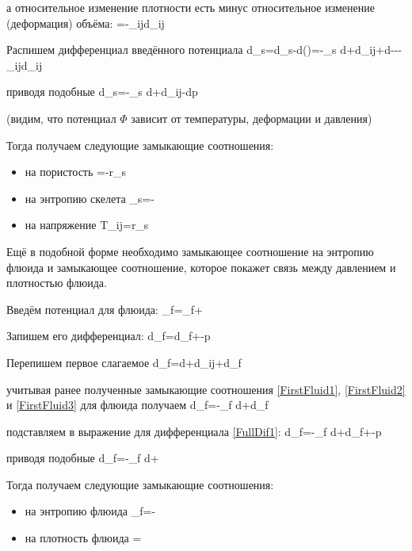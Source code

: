 \documentclass[main.tex]{subfiles}
\begin{document}
а относительное изменение плотности есть минус относительное изменение (деформация) объёма:
\beq
{}=-\delta_{ij}d\varepsilon_{ij}
\eeq

Распишем дифференциал введённого потенциала
\beq
d\Phi_s=d\tilde{\Psi}_s-d\left(\right)=-\eta_s d\theta+d\varepsilon_{ij}+d\varphi---\delta_{ij}d\varepsilon_{ij}
\eeq

приводя подобные
\beq
d\Phi_s=-\eta_s d\theta+d\varepsilon_{ij}-dp
\eeq

(видим, что потенциал $\Phi$ зависит от температуры, деформации и давления)

Тогда получаем следующие замыкающие соотношения:

\begin{itemize}
\item на пористость
\beq
\varphi=-r_s
\eeq

\item на энтропию скелета
\beq
\eta_s=-
\eeq

\item на напряжение
\beq
T_{ij}=r_s
\eeq
\end{itemize}

Ещё в подобной форме необходимо замыкающее соотношение на энтропию флюида и замыкающее соотношение, которое покажет связь между давлением и плотностью флюида.

Введём потенциал для флюида:
\beq
\Phi_f=\Psi_f+
\eeq

Запишем его дифференциал:
\beq\label{FullDif1}
d\Phi_f=d\Psi_f+-p
\eeq

Перепишем первое слагаемое
\beq
d\Psi_f=d\theta+d\varepsilon_{ij}+d\rho_f
\eeq

учитывая ранее полученные замыкающие соотношения \eqref{FirstFluid1}, \eqref{FirstFluid2} и \eqref{FirstFluid3} для флюида получаем
\beq
d\Psi_f=-\eta_f d\theta+d\rho_f
\eeq

подставляем в выражение для дифференциала \eqref{FullDif1}:
\beq
d\Phi_f=-\eta_f d\theta+d\rho_f+-p
\eeq

приводя подобные
\beq
d\Phi_f=-\eta_f d\theta+
\eeq

Тогда получаем следующие замыкающие соотношения:

\begin{itemize}
\item на энтропию флюида
\beq
\eta_f=-
\eeq

\item на плотность флюида
\beq
{}=
\eeq
\end{itemize}
\end{document}
